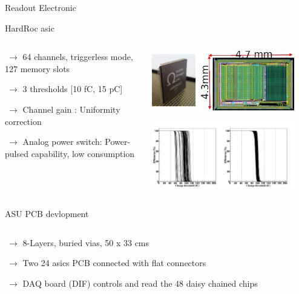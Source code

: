 \documentclass[10pt]{beamer}
\begin{document}
\begin{frame}[shrink=3]{Readout Electronic}
\begin{block}{HardRoc asic}
    \begin{columns}
      \begin{column}{0.5\textwidth}
        {\small 
          \par $ ~ \rightarrow$ 64 channels, triggerless mode, 127 memory slots
          \par $ ~\rightarrow$  3 thresholds [10 fC,  15 pC]
          \par $ ~\rightarrow$  Channel gain : Uniformity correction
          \par $ ~\rightarrow$  Analog power switch: Power-pulsed capability, low consumption

        }
      \end{column}

      \begin{column}{0.5\textwidth}
         \centerline{\includegraphics[width=0.9\textwidth]{jpg/HR2Chip}}
         \centerline{\includegraphics[width=0.9\textwidth]{jpg/HR2GainAdjustement}}
      \end{column}

    \end{columns}
\end{block}
\pause
\begin{block}{ASU PCB devlopment}
    \begin{columns}
      \begin{column}{0.5\textwidth}
        {\small 
          \par $ ~ \rightarrow$ 8-Layers, buried vias, 50 x 33 cms
          \par $ ~\rightarrow$  Two 24 asics PCB connected with flat connectors
          \par $ ~\rightarrow$  DAQ board (DIF) controls and read the 48 daisy chained chips
        }
      \end{column}


\end{columns}
\end{block}
\end{frame}
\end{document}
